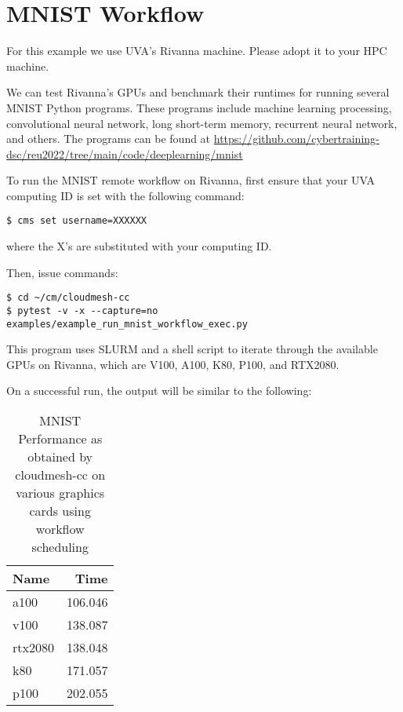 \section{MNIST Workflow}\label{mnist-workflow}

For this example we use UVA's Rivanna machine. Please adopt it to your
HPC machine.

We can test Rivanna's GPUs and benchmark their runtimes for running
several MNIST Python programs. These programs include machine learning
processing, convolutional neural network, long short-term memory,
recurrent neural network, and others. The programs can be found at
\url{https://github.com/cybertraining-dsc/reu2022/tree/main/code/deeplearning/mnist}

To run the MNIST remote workflow on Rivanna, first ensure that your UVA
computing ID is set with the following command:

\bigbreak
\begin{verbatim}
$ cms set username=XXXXXX
\end{verbatim}
\bigbreak

where the X's are substituted with your computing ID.

Then, issue commands:

\bigbreak
\begin{verbatim}
$ cd ~/cm/cloudmesh-cc
$ pytest -v -x --capture=no examples/example_run_mnist_workflow_exec.py
\end{verbatim}
\bigbreak

This program uses SLURM and a shell script to iterate through the
available GPUs on Rivanna, which are V100, A100, K80, P100, and RTX2080.

On a successful run, the output will be similar to the following:

\begin{table}[!ht]
\caption{MNIST Performance as obtained by cloudmesh-cc on various graphics cards using workflow scheduling}
    \centering
    \begin{tabular}{lr}
    \hline
        Name & Time \\ \hline
        a100 & 106.046 \\ 
        v100 & 138.087 \\ 
        rtx2080 & 138.048 \\
        k80 & 171.057 \\ 
        p100 & 202.055 \\
    \end{tabular}
    \label{table:mnist-times}
  \end{table}
  
